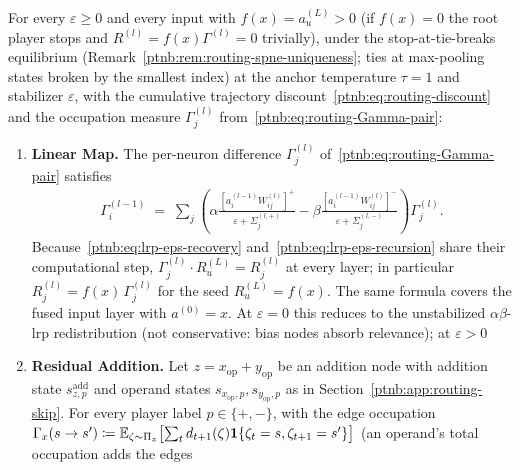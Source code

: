 \begin{theoremenv}\label{ptnb:thm:ab-recovery}
For every $\varepsilon \ge 0$ and every input with $f(x)=a_u^{(L)}>0$ (if $f(x)=0$ the root player
stops and $R^{(l)}=f(x)\Gamma^{(l)}=0$ trivially), under the stop-at-tie-breaks equilibrium
(Remark~\ref{ptnb:rem:routing-spne-uniqueness}; ties at max-pooling states broken by the smallest index)
at the anchor temperature $\tau = 1$ and stabilizer $\varepsilon$, with the cumulative trajectory
discount~\eqref{ptnb:eq:routing-discount} and the occupation measure $\Gamma_j^{(l)}$
from~\eqref{ptnb:eq:routing-Gamma-pair}:
\begin{enumerate}
    \item \textbf{Linear Map.} The per-neuron difference $\Gamma^{(l)}_j$ of~\eqref{ptnb:eq:routing-Gamma-pair}
        satisfies
        \begin{align}\label{ptnb:eq:lrp-eps-recovery}
            \Gamma^{(l-1)}_i
            \;=\; \sum_j \left(
            \alpha \frac{[a_i^{(l-1)} W_{ij}^{(l)}]^+}{\varepsilon + \Sigma_j^{(l,+)}}
            -
            \beta \frac{[a_i^{(l-1)} W_{ij}^{(l)}]^-}{\varepsilon + \Sigma_j^{(l,-)}}
            \right) \Gamma^{(l)}_j.
        \end{align}
        Because~\eqref{ptnb:eq:lrp-eps-recovery} and~\eqref{ptnb:eq:lrp-eps-recursion} share their computational
        step, $\Gamma^{(l)}_j \cdot R_u^{(L)} = R^{(l)}_j$ at every layer; in particular $R^{(l)}_j =
            f(x)\,\Gamma^{(l)}_j$ for the seed $R^{(L)}_u = f(x)$. The same formula covers the fused input
        layer with $a^{(0)} = x$. At $\varepsilon = 0$ this reduces to the unstabilized
        $\alpha\beta$-\ac{lrp} redistribution (not conservative: bias nodes absorb relevance); at
        $\varepsilon > 0$ 
    \item \textbf{Residual Addition.} Let $z = x_{\mathrm{op}} + y_{\mathrm{op}}$ be an addition node with
        addition state $s^{\mathrm{add}}_{z,p}$ and operand states $s_{x_{\mathrm{op}},p},
            s_{y_{\mathrm{op}},p}$ as in Section~\ref{ptnb:app:routing-skip}. For every player label $p\in\{+,-\}$,
        with the edge occupation $\Gamma_x(s\to s')\coloneqq\mathbb{E}_{\zeta\sim\Pi_x}\bigl[\sum_t
            d_{t+1}(\zeta)\mathbf{1}\{\zeta_t=s,\zeta_{t+1}=s'\}\bigr]$ (an operand's total occupation adds the edges

\end{enumerate}
\end{theoremenv}
